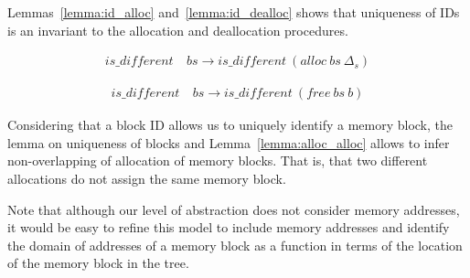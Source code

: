 Lemmas~\ref{lemma:id_alloc} and~\ref{lemma:id_dealloc} shows that uniqueness of IDs is an invariant to the allocation and deallocation procedures.


\begin{lemma}  \label{lemma:id_alloc}
\begin{align*}
is\_different\ &bs \longrightarrow is\_different\ (alloc\ bs\ \Delta_s)
\end{align*}
\end{lemma}

\begin{lemma}  \label{lemma:id_dealloc}
\begin{align*}
is\_different\ &bs \longrightarrow is\_different\ (free\ bs\ b)
\end{align*}
\end{lemma}




Considering that a block ID allows us to uniquely identify a memory block, the lemma on uniqueness of blocks and Lemma~\ref{lemma:alloc_alloc} allows to infer non-overlapping of allocation of memory blocks. That is, that two different allocations do not assign the same memory block.

Note that although our level of abstraction does not consider memory addresses, it would be easy to refine this model to include memory addresses and identify the domain of addresses of a memory block as a function in terms of the location of the memory block in the tree.


